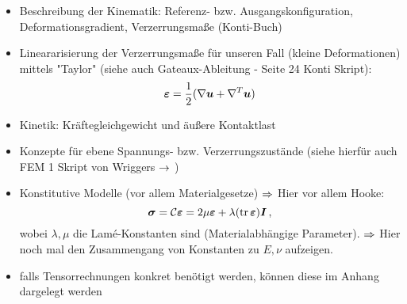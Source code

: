 \begin{itemize}
\item Beschreibung der Kinematik: Referenz- bzw. Ausgangskonfiguration, Deformationsgradient, Verzerrungsmaße (Konti-Buch)
\item Lineararisierung der Verzerrungsmaße für unseren Fall (kleine Deformationen) mittels "Taylor" (siehe auch Gateaux-Ableitung - Seite 24 Konti Skript):
\[
	\boldsymbol {\varepsilon} = \frac 1 2 (\nabla \boldsymbol u + \nabla^T \boldsymbol u)
\]
\item Kinetik: Kräftegleichgewicht und äußere Kontaktlast
\item Konzepte für ebene Spannungs- bzw. Verzerrungszustände (siehe hierfür auch FEM 1 Skript von Wriggers $\rightarrow$ \cite{WriggersFEMSkript})
\item Konstitutive Modelle (vor allem Materialgesetze) $\Rightarrow$ Hier vor allem Hooke:
\[
	\boldsymbol \sigma = \mathcal C \boldsymbol {\varepsilon} = 2 \mu \boldsymbol {\varepsilon} + \lambda (\operatorname{tr} \boldsymbol {\varepsilon}) \boldsymbol I \, ,
\]
wobei $\lambda,\mu$ die Lamé-Konstanten sind (Materialabhängige Parameter). $\Rightarrow$ Hier noch mal den Zusammengang von Konstanten zu $E,\nu$ aufzeigen.
\item falls Tensorrechnungen konkret benötigt werden, können diese im Anhang dargelegt werden
\end{itemize}


\newpage

